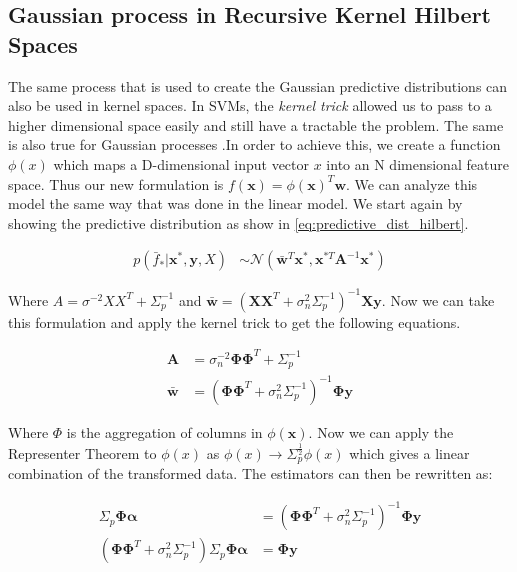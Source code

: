 \documentclass[11pt, twoside]{article}   	%
\begin{document}
\subsection{Gaussian process in Recursive Kernel Hilbert Spaces}
The same process that is used to create the Gaussian predictive distributions can also be used
in kernel spaces. In SVMs, the \textit{kernel trick} allowed us to pass to a higher dimensional 
space easily and still have a tractable the problem. The same is also true for Gaussian processes
\cite{gauss_proc}.In order to achieve this, we create a function $\phi(x)$ which maps a D-dimensional
input vector $x$ into an N dimensional feature space. Thus our new formulation is $f(\mathbf{x}) = 
\phi(\mathbf{x})^T\mathbf{w}$. We can analyze this model the same way that was done in the linear model. 
We start again by showing the predictive distribution as show in \ref{eq:predictive_dist_hilbert}.

\begin{align}
p(\bar{f}_*|\mathbf{x}^*, \mathbf{y}, X) & \sim 
  \mathcal{N}(\mathbf{\bar{w}}^T \mathbf{x}^*, \mathbf{x}^{*T} \mathbf{A}^{-1} \mathbf{x}^*)
\label{eq:predictive_dist_hilbert}
\end{align}

Where $A = \sigma^{-2}XX^T + \Sigma_p^{-1}$ and $\mathbf{\bar{w}} = (\mathbf{XX}^T +
\sigma_n^2 \Sigma_p^{-1})^{-1} \mathbf{Xy}$. Now we can take this formulation and apply
the kernel trick to get the following equations. 

\begin{align}
\mathbf{A} &= \sigma_n^{-2} \mathbf{\Phi \Phi}^T + \Sigma_p^{-1} \\
\mathbf{\bar{w}} &= (\mathbf{\Phi \Phi}^T + \sigma^2_n \Sigma_p^{-1})^{-1} \mathbf{\Phi y}
\end{align}

Where $\Phi$ is the aggregation of columns in $\phi(\mathbf{x})$. Now we can apply the Representer 
Theorem to $\phi(x)$ as $\phi(x) \rightarrow \Sigma^{\frac{1}{2}}_p \phi(x)$ which gives a linear
combination of the transformed data. The estimators can then be rewritten as: 

\begin{align}
\Sigma_p \mathbf{\Phi \alpha} &= (\mathbf{\Phi \Phi}^T + \sigma^2_n \Sigma^{-1}_p)^{-1} \mathbf{\Phi y} \\ 
(\mathbf{\Phi \Phi}^T + \sigma^2_n \Sigma^{-1}_p) \Sigma_p \mathbf{\Phi \alpha} &= \mathbf{\Phi y}
\label{eq:representer_phi}
\end{align}
\end{document}
